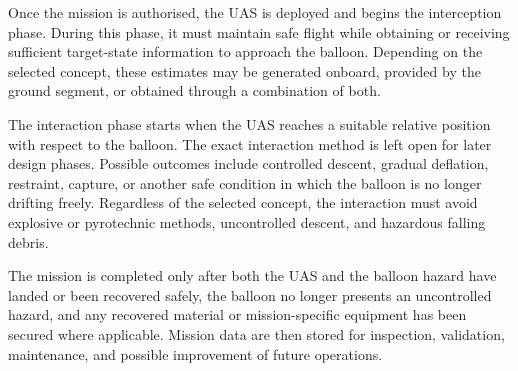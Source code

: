 Once the mission is authorised, the UAS is deployed and begins the interception phase. During this phase, it must maintain safe flight while obtaining or receiving sufficient target-state information to approach the balloon. Depending on the selected concept, these estimates may be generated onboard, provided by the ground segment, or obtained through a combination of both.

The interaction phase starts when the UAS reaches a suitable relative position with respect to the balloon. The exact interaction method is left open for later design phases. Possible outcomes include controlled descent, gradual deflation, restraint, capture, or another safe condition in which the balloon is no longer drifting freely. Regardless of the selected concept, the interaction must avoid explosive or pyrotechnic methods, uncontrolled descent, and hazardous falling debris.

The mission is completed only after both the UAS and the balloon hazard have landed or been recovered safely, the balloon no longer presents an uncontrolled hazard, and any recovered material or mission-specific equipment has been secured where applicable. Mission data are then stored for inspection, validation, maintenance, and possible improvement of future operations.

